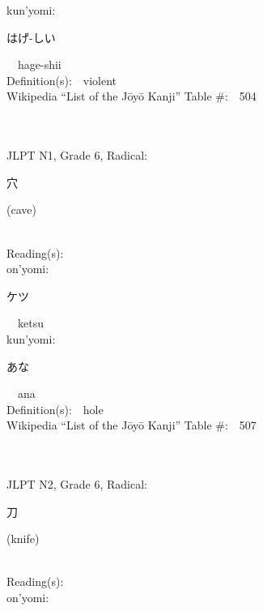 \begin{multicols}{2}
{\hspace*{1em}}kun'yomi:\ \ \\
{\hspace*{2em}}{\begin{CJK}{UTF8}{min} はげ-しい \end{CJK}}\ \ hage-shii\ \ \\
Definition(s):\ \ violent \\
Wikipedia ``List of the J\=oy\=o Kanji'' Table \#:\ \ 504 \\
\ \ \\
{\fontsize{34pt}{40pt}  }\ \ \\  %
{JLPT N1, Grade 6, Radical:\ \ {\begin{CJK}{UTF8}{min} 穴 \end{CJK}} (cave) } \\
Reading(s):\ \ \\
{\hspace*{1em}}on'yomi:\ \ \\
{\hspace*{2em}}{\begin{CJK}{UTF8}{min} ケツ \end{CJK}}\ \ ketsu\ \ \\
{\hspace*{1em}}kun'yomi:\ \ \\
{\hspace*{2em}}{\begin{CJK}{UTF8}{min} あな \end{CJK}}\ \ ana\ \ \\
Definition(s):\ \ hole \\
Wikipedia ``List of the J\=oy\=o Kanji'' Table \#:\ \ 507 \\
\ \ \\
{\fontsize{34pt}{40pt}  }\ \ \\  %
{JLPT N2, Grade 6, Radical:\ \ {\begin{CJK}{UTF8}{min} 刀 \end{CJK}} (knife) } \\
Reading(s):\ \ \\
{\hspace*{1em}}on'yomi:\ \ \\

\end{multicols}
